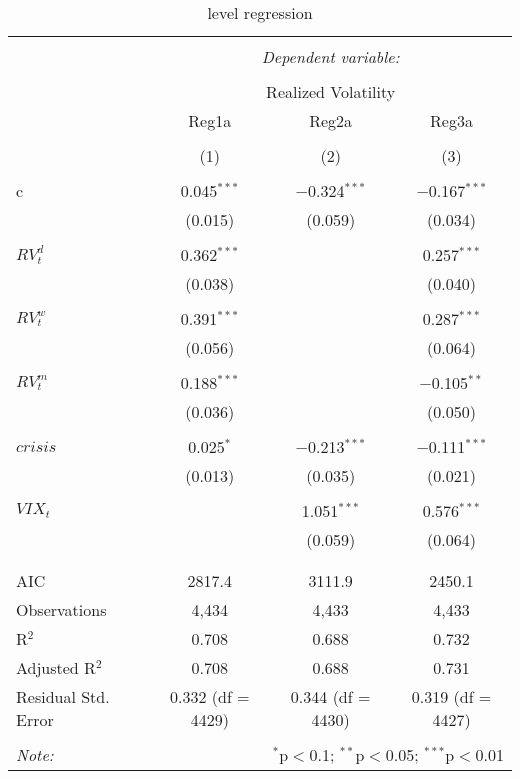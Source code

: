 
\begin{table}[!htbp] \centering 
  \caption{level regression} 
  \label{} 
\begin{tabular}{@{\extracolsep{5pt}}lccc} 
\\[-1.8ex]\hline 
\hline \\[-1.8ex] 
 & \multicolumn{3}{c}{\textit{Dependent variable:}} \\ 
\cline{2-4} 
\\[-1.8ex] & \multicolumn{3}{c}{Realized Volatility} \\ 
 & Reg1a & Reg2a & Reg3a \\ 
\\[-1.8ex] & (1) & (2) & (3)\\ 
\hline \\[-1.8ex] 
 c & 0.045$^{***}$ & $-$0.324$^{***}$ & $-$0.167$^{***}$ \\ 
  & (0.015) & (0.059) & (0.034) \\ 
  & & & \\ 
 $ RV^{d}_{t}$ & 0.362$^{***}$ &  & 0.257$^{***}$ \\ 
  & (0.038) &  & (0.040) \\ 
  & & & \\ 
 $RV^{w}_{t}$ & 0.391$^{***}$ &  & 0.287$^{***}$ \\ 
  & (0.056) &  & (0.064) \\ 
  & & & \\ 
 $RV^{m}_{t}$ & 0.188$^{***}$ &  & $-$0.105$^{**}$ \\ 
  & (0.036) &  & (0.050) \\ 
  & & & \\ 
 $crisis$ & 0.025$^{*}$ & $-$0.213$^{***}$ & $-$0.111$^{***}$ \\ 
  & (0.013) & (0.035) & (0.021) \\ 
  & & & \\ 
 $VIX_{t}$ &  & 1.051$^{***}$ & 0.576$^{***}$ \\ 
  &  & (0.059) & (0.064) \\ 
  & & & \\ 
\hline \\[-1.8ex] 
AIC & 2817.4 & 3111.9 & 2450.1 \\ 
Observations & 4,434 & 4,433 & 4,433 \\ 
R$^{2}$ & 0.708 & 0.688 & 0.732 \\ 
Adjusted R$^{2}$ & 0.708 & 0.688 & 0.731 \\ 
Residual Std. Error & 0.332 (df = 4429) & 0.344 (df = 4430) & 0.319 (df = 4427) \\ 
\hline 
\hline \\[-1.8ex] 
\textit{Note:}  & \multicolumn{3}{r}{$^{*}$p$<$0.1; $^{**}$p$<$0.05; $^{***}$p$<$0.01} \\ 
\end{tabular} 
\end{table} 
